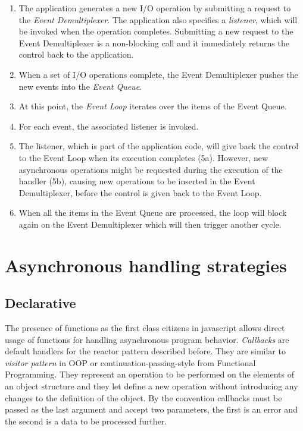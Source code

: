 \begin{enumerate}
	\item The application generates a new I/O operation by submitting a request to the \textit{Event Demultiplexer}. The application also specifies a \textit{listener}, which will be invoked when the operation completes. Submitting a new request to the Event Demultiplexer is a non-blocking call and it immediately returns the control back to the application.
	\item When a set of I/O operations complete, the Event Demultiplexer pushes the new events into the \textit{Event Queue}.
	\item At this point, the \textit{Event Loop} iterates over the items of the Event Queue.
	\item For each event, the associated listener is invoked.
	\item The listener, which is part of the application code, will give back the control to the Event Loop when its execution completes (5a). However, new asynchronous operations might be requested during the execution of the handler (5b), causing new operations to be inserted in the Event Demultiplexer, before the control is given back to the Event Loop.
	\item When all the items in the Event Queue are processed, the loop will block again on the Event Demultiplexer which will then trigger another cycle.
\end{enumerate}

\section{Asynchronous handling strategies}
\label{sec:asyncstrat}
\subsection{Declarative}
The presence of functions as the first class citizens in javascript allows direct usage of functions for handling asynchronous program behavior. \textit{Callbacks} are default handlers for the reactor pattern described before. They are similar to \textit{visitor pattern} in OOP or continuation-passing-style from Functional Programming. They represent an operation to be performed on the elements of an object structure and they let define a new operation without introducing any changes to the definition of the object. 
By the convention callbacks must be passed as the last argument and accept two parameters, the first is an error and the second is a data to be processed further.

